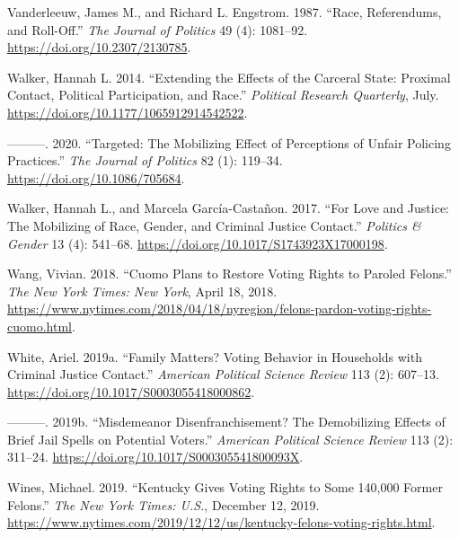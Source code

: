 \documentclass[
  12pt,
]{article}
\newlength{\cslhangindent}
\newenvironment{cslreferences}%
  {\setlength{\parindent}{0pt}%
  \everypar{\setlength{\hangindent}{\cslhangindent}}\ignorespaces}%
  {\par}
\begin{document}
\begin{cslreferences}
\leavevmode\hypertarget{ref-Vanderleeuw1987}{}%
Vanderleeuw, James M., and Richard L. Engstrom. 1987. ``Race, Referendums, and Roll-Off.'' \emph{The Journal of Politics} 49 (4): 1081--92. \url{https://doi.org/10.2307/2130785}.

\leavevmode\hypertarget{ref-Walker2014}{}%
Walker, Hannah L. 2014. ``Extending the Effects of the Carceral State: Proximal Contact, Political Participation, and Race.'' \emph{Political Research Quarterly}, July. \url{https://doi.org/10.1177/1065912914542522}.

\leavevmode\hypertarget{ref-Walker2020}{}%
---------. 2020. ``Targeted: The Mobilizing Effect of Perceptions of Unfair Policing Practices.'' \emph{The Journal of Politics} 82 (1): 119--34. \url{https://doi.org/10.1086/705684}.

\leavevmode\hypertarget{ref-Walker2017}{}%
Walker, Hannah L., and Marcela García-Castañon. 2017. ``For Love and Justice: The Mobilizing of Race, Gender, and Criminal Justice Contact.'' \emph{Politics \& Gender} 13 (4): 541--68. \url{https://doi.org/10.1017/S1743923X17000198}.

\leavevmode\hypertarget{ref-Wang2018}{}%
Wang, Vivian. 2018. ``Cuomo Plans to Restore Voting Rights to Paroled Felons.'' \emph{The New York Times: New York}, April 18, 2018. \url{https://www.nytimes.com/2018/04/18/nyregion/felons-pardon-voting-rights-cuomo.html}.

\leavevmode\hypertarget{ref-White2019a}{}%
White, Ariel. 2019a. ``Family Matters? Voting Behavior in Households with Criminal Justice Contact.'' \emph{American Political Science Review} 113 (2): 607--13. \url{https://doi.org/10.1017/S0003055418000862}.

\leavevmode\hypertarget{ref-White2019}{}%
---------. 2019b. ``Misdemeanor Disenfranchisement? The Demobilizing Effects of Brief Jail Spells on Potential Voters.'' \emph{American Political Science Review} 113 (2): 311--24. \url{https://doi.org/10.1017/S000305541800093X}.

\leavevmode\hypertarget{ref-Wines2019}{}%
Wines, Michael. 2019. ``Kentucky Gives Voting Rights to Some 140,000 Former Felons.'' \emph{The New York Times: U.S.}, December 12, 2019. \url{https://www.nytimes.com/2019/12/12/us/kentucky-felons-voting-rights.html}.
\end{cslreferences}
\end{document}
